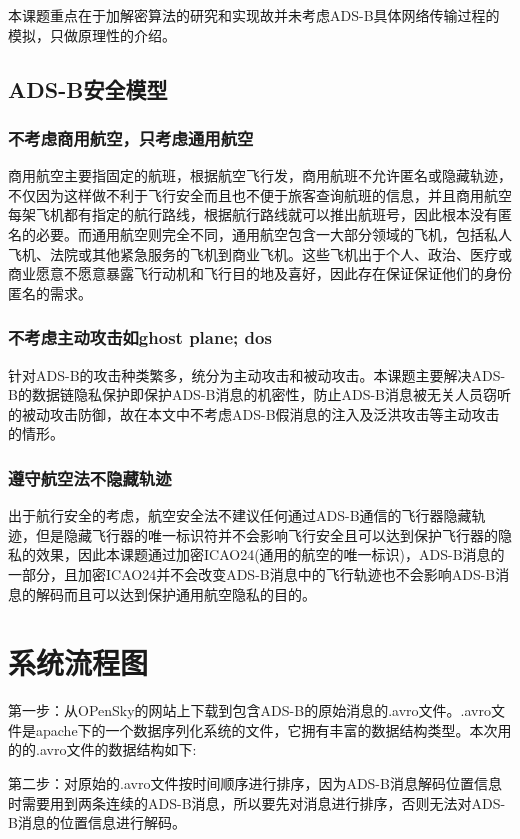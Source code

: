 本课题重点在于加解密算法的研究和实现故并未考虑ADS-B具体网络传输过程的模拟，只做原理性的介绍。

\subsection{ADS-B安全模型}
\subsubsection{不考虑商用航空，只考虑通用航空}
商用航空主要指固定的航班，根据航空飞行发，商用航班不允许匿名或隐藏轨迹，不仅因为这样做不利于飞行安全而且也不便于旅客查询航班的信息，并且商用航空每架飞机都有指定的航行路线，根据航行路线就可以推出航班号，因此根本没有匿名的必要。而通用航空则完全不同，通用航空包含一大部分领域的飞机，包括私人飞机、法院或其他紧急服务的飞机到商业飞机。这些飞机出于个人、政治、医疗或商业愿意不愿意暴露飞行动机和飞行目的地及喜好，因此存在保证保证他们的身份匿名的需求。

\subsubsection{不考虑主动攻击如ghost plane; dos}
针对ADS-B的攻击种类繁多，统分为主动攻击和被动攻击。本课题主要解决ADS-B的数据链隐私保护即保护ADS-B消息的机密性，防止ADS-B消息被无关人员窃听的被动攻击防御，故在本文中不考虑ADS-B假消息的注入及泛洪攻击等主动攻击的情形。

\subsubsection{遵守航空法不隐藏轨迹}
出于航行安全的考虑，航空安全法不建议任何通过ADS-B通信的飞行器隐藏轨迹，但是隐藏飞行器的唯一标识符并不会影响飞行安全且可以达到保护飞行器的隐私的效果，因此本课题通过加密ICAO24(通用的航空的唯一标识)，ADS-B消息的一部分，且加密ICAO24并不会改变ADS-B消息中的飞行轨迹也不会影响ADS-B消息的解码而且可以达到保护通用航空隐私的目的。

\section{系统流程图}

第一步：从OPenSky的网站上下载到包含ADS-B的原始消息的.avro文件。.avro文件是apache下的一个数据序列化系统的文件，它拥有丰富的数据结构类型。本次用的的.avro文件的数据结构如下:



第二步：对原始的.avro文件按时间顺序进行排序，因为ADS-B消息解码位置信息时需要用到两条连续的ADS-B消息，所以要先对消息进行排序，否则无法对ADS-B消息的位置信息进行解码。

